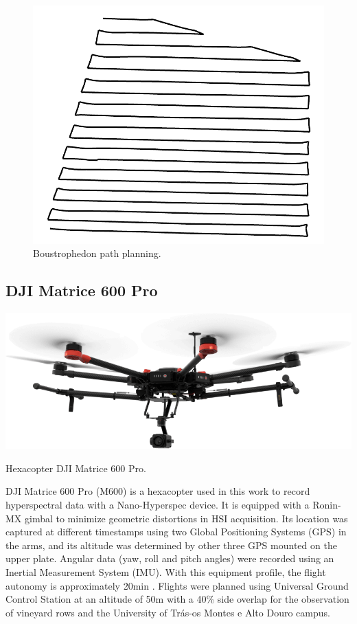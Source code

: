 \begin{figure}[!ht]
	\includegraphics[width=.5\linewidth]{figs/materials/boustrophedon.png}
	\caption{Boustrophedon path planning.}
    \label{fig:boustrophedon}
\end{figure}

\subsection{DJI Matrice 600 Pro}

\begin{marginfigure}[.1cm]
	\includegraphics{figs/materials/dji_matrice_600_pro.png}
	\caption{Hexacopter DJI Matrice 600 Pro.}
	\label{fig:dji_matrice_600_pro}
\end{marginfigure}
DJI Matrice 600 Pro (M600) is a hexacopter used in this work to record hyperspectral data with a Nano-Hyperspec device. It is equipped with a Ronin-MX gimbal to minimize geometric distortions in HSI acquisition. Its location was captured at different timestamps using two Global Positioning Systems (GPS) in the arms, and its altitude was determined by other three GPS mounted on the upper plate. Angular data (yaw, roll and pitch angles) were recorded using an Inertial Measurement System (IMU). With this equipment profile, the flight autonomy is approximately 20\si{\minute} \cite{sousa_uav-based_2022}. Flights were planned using Universal Ground Control Station at an altitude of 50\si{\meter} with a 40\% side overlap for the observation of vineyard rows and the University of Trás-os Montes e Alto Douro campus.

